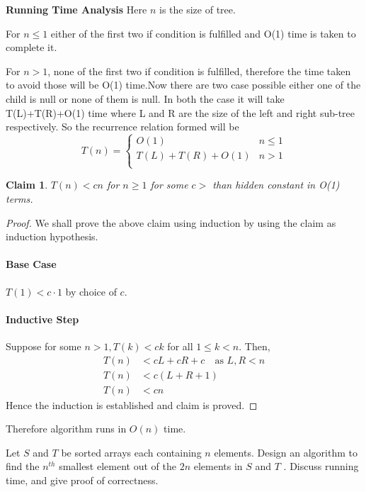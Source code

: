 \documentclass[answers]{exam}
\newtheorem{claim}{Claim}
\begin{document}
\begin{questions}
\begin{solution}
\textbf{Running Time Analysis}
Here $n$ is the size of tree.

For $n\leq1$ either of the first two if condition is fulfilled and O(1) time is taken to complete it.

For $n>1$, none of the first two if condition is fulfilled, therefore the time taken to avoid those will be O(1) time.Now there are two case possible either one of the child is null or none of them is null. In both the case it will take T(L)+T(R)+O(1) time where L and R are the size of the left and right sub-tree respectively. So the recurrence relation formed will be
\[
    T(n) = 
    \begin{cases}
        O(1) & n\leq1 \\
        T(L)+T(R) + O(1) & n > 1 \\
    \end{cases}
\]

\begin{claim}
$T(n) < cn$ for $n\geq 1$ for some $c > $ than hidden constant in O(1) terms.
\end{claim}
\begin{proof}
We shall prove the above claim using induction by using the claim as induction hypothesis.

\paragraph{Base Case} $T(1) < c \cdot 1$ by choice of $c$.
\paragraph{Inductive Step} Suppose for some $n>1 ,T(k) < ck$ for all $1 \leq k < n$. Then,
\begin{align*}
T(n) &< cL+cR+c \quad \text{as $L,R < n$}\\
T(n) &< c(L+R+1)\\
T(n) &< cn
\end{align*}
Hence the induction is established and claim is proved.
\end{proof}
Therefore algorithm runs in $O(n)$ time.

\end{solution}


\vspace{0.3in}








\question[20]
Let $S$ and $T$ be sorted arrays each containing $n$ elements. Design an algorithm to find the $n^{th}$ smallest element out of the $2n$ elements in $S$ and $T$ .
Discuss running time, and give proof of correctness.



\end{questions}
\end{document}
